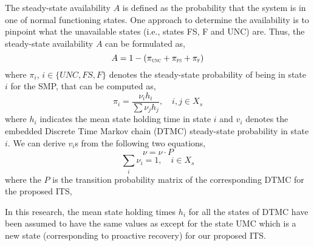 \documentclass[preprint,number,12pt]{elsarticle}
\begin{document}
The steady-state availability $A$ is defined as the probability that the system is in one of normal functioning states. One approach to determine the availability is to pinpoint what the unavailable states (i.e., states FS, F and UNC) are. Thus, the steady-state availability $A$ can be formulated as,
\begin{equation} \label{eq: availability}
A=1-(\pi_{\scalebox{0.5}{UNC}} + \pi_{\scalebox{0.5}{FS}}+ \pi_{\scalebox{0.5}{F}})
\end{equation}
where $\pi_{i}$, $i \in \{UNC, FS, F\}$ denotes the steady-state probability of being in state $i$ for the SMP, that can be computed as,
\begin{equation} \label{eq: steady state availability in state i}
\pi_{i} = \frac{\nu_{i}h_{i}}{\sum \nu_{j}h_{j}}, \quad i,j \in X_{s}
\end{equation}
where $h_i$ indicates the mean state holding time in state $i$ and $v_i$ denotes the embedded Discrete Time Markov chain (DTMC) steady-state probability in state $i$. We can derive $v_i$s from the following two equations,
\begin{equation} \label{eq: v.p}
\nu = \nu \cdot P
\end{equation}
\begin{equation} \label{eq: sum of vi}
\sum_{i} \nu_{i} = 1, \quad i \in X_{s}
\end{equation}
where the $P$ is the transition probability matrix of the corresponding DTMC for the proposed ITS,

\begin{center}
\end{center}

In this research, the mean state holding times $h_i$ for all the states of DTMC have been assumed to have the same values as\citep{Madan2004167} except for the state UMC which is a new state (corresponding to proactive recovery) for our proposed ITS.
\end{document}

